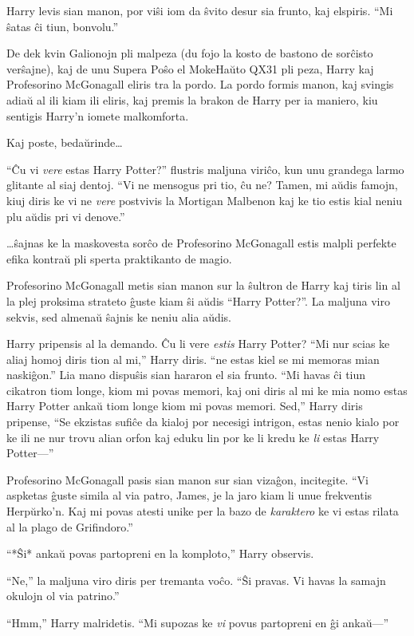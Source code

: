 Harry levis sian manon, por viŝi iom da ŝvito desur sia frunto, kaj
elspiris. ``Mi ŝatas ĉi tiun, bonvolu.''

De dek kvin Galionojn pli malpeza (du fojo la kosto de bastono de
sorĉisto verŝajne), kaj de unu Supera Poŝo el MokeHaŭto QX31 pli peza,
Harry kaj Profesorino McGonagall eliris tra la pordo. La pordo formis
manon, kaj svingis adiaŭ al ili kiam ili eliris, kaj premis la brakon
de Harry per ia maniero, kiu sentigis Harry'n iomete malkomforta.

Kaj poste, bedaŭrinde\ldots

``Ĉu vi \emph{vere} estas Harry Potter?'' flustris maljuna viriĉo, kun
unu grandega larmo glitante al siaj dentoj. ``Vi ne mensogus pri tio,
ĉu ne?  Tamen, mi aŭdis famojn, kiuj diris ke vi ne \emph{vere}
postvivis la Mortigan Malbenon kaj ke tio estis kial neniu plu aŭdis
pri vi denove.''

\ldots ŝajnas ke la maskovesta sorĉo de Profesorino McGonagall estis
malpli perfekte efika kontraŭ pli sperta praktikanto de magio.

Profesorino McGonagall metis sian manon sur la ŝultron de Harry kaj
tiris lin al la plej proksima strateto ĝuste kiam ŝi aŭdis ``Harry
Potter?''. La maljuna viro sekvis, sed almenaŭ ŝajnis ke neniu alia
aŭdis.

Harry pripensis al la demando. Ĉu li vere \emph{estis} Harry Potter?
``Mi nur scias ke aliaj homoj diris tion al mi,'' Harry diris. ``ne
estas kiel se mi memoras mian naskiĝon.'' Lia mano dispuŝis sian
hararon el sia frunto. ``Mi havas ĉi tiun cikatron tiom longe, kiom mi
povas memori, kaj oni diris al mi ke mia nomo estas Harry Potter ankaŭ
tiom longe kiom mi povas memori. Sed,'' Harry diris pripense, ``Se
ekzistas sufiĉe da kialoj por necesigi intrigon, estas nenio kialo por
ke ili ne nur trovu alian orfon kaj eduku lin por ke li kredu ke
\emph{li} estas Harry Potter—''

Profesorino McGonagall pasis sian manon sur sian vizaĝon,
incitegite. ``Vi aspketas ĝuste simila al via patro, James, je la jaro
kiam li unue frekventis Herpŭrko'n. Kaj mi povas atesti unike per la
bazo de \emph{karaktero} ke vi estas rilata al la plago de
Grifindoro.''

``*Ŝi* ankaŭ povas partopreni en la komploto,'' Harry observis.

``Ne,'' la maljuna viro diris per tremanta voĉo. ``Ŝi pravas. Vi havas
la samajn okulojn ol via patrino.''

``Hmm,'' Harry malridetis. ``Mi supozas ke \emph{vi} povus partopreni en ĝi
ankaŭ—''

